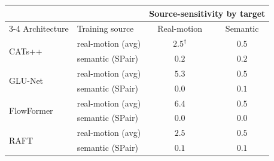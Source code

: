 \begin{tabular}{ll cc}
\toprule
 & & \multicolumn{2}{c}{Source-sensitivity by target} \\
\cmidrule(lr){3-4}
Architecture & Training source & Real-motion & Semantic \\
\midrule
\multirow{2}{*}{CATs++}
 & real-motion (avg) & \cellcolor{green!16}$2.5^{\dagger}$ & \cellcolor{gray!15}$0.5$ \\
 & semantic (SPair)  & \cellcolor{gray!15}$0.2$ & \cellcolor{gray!15}$0.2$ \\
\midrule
\multirow{2}{*}{GLU-Net}
 & real-motion (avg) & \cellcolor{green!16}$\mathbf{5.3}$ & \cellcolor{gray!15}$0.5$ \\
 & semantic (SPair)  & \cellcolor{gray!15}$0.0$ & \cellcolor{gray!15}$0.1$ \\
\midrule
\multirow{2}{*}{FlowFormer}
 & real-motion (avg) & \cellcolor{green!16}$\mathbf{6.4}$ & \cellcolor{gray!15}$0.5$ \\
 & semantic (SPair)  & \cellcolor{gray!15}$0.0$ & \cellcolor{gray!15}$0.0$ \\
\midrule
\multirow{2}{*}{RAFT}
 & real-motion (avg) & \cellcolor{green!16}$2.5$ & \cellcolor{gray!15}$0.5$ \\
 & semantic (SPair)  & \cellcolor{gray!15}$0.1$ & \cellcolor{gray!15}$0.1$ \\
\bottomrule
\end{tabular}
